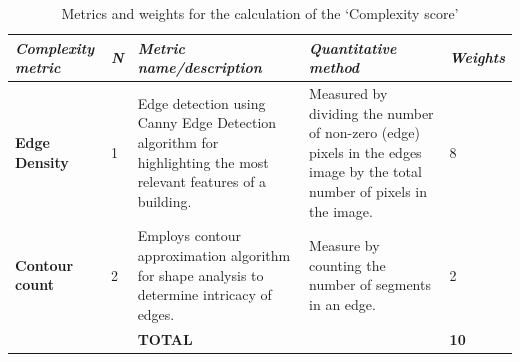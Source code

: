 \documentclass[final,5p,times]{elsarticle}
\begin{document}
            \begin{table}[htb]
                \centering
                \small
                \caption{Metrics and weights for the calculation of the `Complexity score'}
                \label{tab:MetricsandWeights}
                \begin{tabularx}{\textwidth}{p{3.5cm} p{1cm} X X p{1cm}}
                    \toprule
                    \textit{Complexity metric} &
                      \textit{N} &
                      \textit{Metric name/description} &
                      \textit{Quantitative   method} &
                      \textit{Weights} \\ \midrule
                    \textbf{Edge Density} &
                      1 &
                      Edge detection using Canny Edge Detection algorithm for highlighting the most relevant features of a building.
                        &
                      Measured by dividing the number of non-zero (edge) pixels in the edges image by the total number of pixels in the image.
                        &
                      8\\
                    \textbf{Contour count} &
                      2 &
                      Employs contour approximation algorithm for shape analysis to determine intricacy of edges.
                        &
                      Measure by counting the number of segments in an edge.
                        &
                      2\\ \bottomrule
                       &
                       &
                      \textbf{TOTAL} &
                      &
                      \textbf{10}\\ \bottomrule
                \end{tabularx}
            \end{table}

\end{document}
